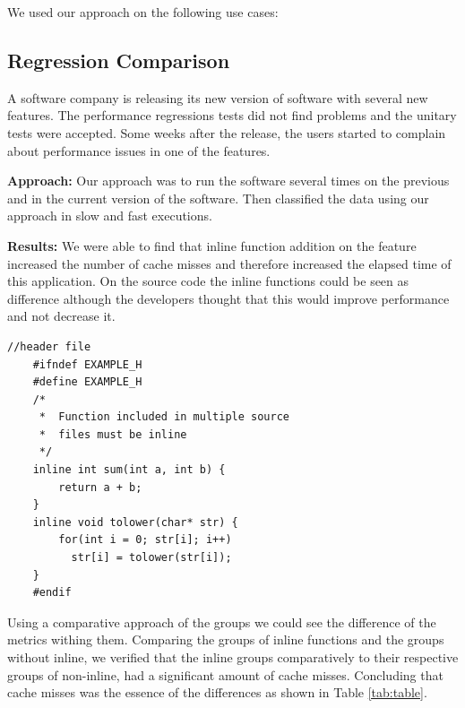 We used our approach on the following use cases:

\subsection{\textbf{Regression Comparison}}
    A software company is releasing its new version of software with several new features. The performance regressions tests did not find problems and the unitary tests were accepted. Some weeks after the release, the users started to complain about performance issues in one of the features.
    
\textbf{Approach:} 
    Our approach was to run the software several times on the previous and in the current version of the software. Then classified the data using our approach in slow and fast executions. 
        
\textbf{Results:}
    We were able to find that inline function addition on the feature increased the number of cache misses and therefore increased the elapsed time of this application. On the source code the inline functions could be seen as difference although the developers thought that this would improve performance and not decrease it.
    
    \begin{lstlisting}[caption={Example of Code for inline}, label=pseudo:case-inline, captionpos=b]
    //header file
    #ifndef EXAMPLE_H
    #define EXAMPLE_H
    /*  
     *  Function included in multiple source
     *  files must be inline 
     */
    inline int sum(int a, int b) {
        return a + b;
    }
    inline void tolower(char* str) {
        for(int i = 0; str[i]; i++)
          str[i] = tolower(str[i]);
    }
    #endif
    \end{lstlisting}
    
    
    Using a comparative approach of the groups we could see the difference of the metrics withing them. Comparing the groups of inline functions and the groups without inline, we verified that the inline groups comparatively to their respective groups of non-inline, had a significant amount of cache misses. Concluding that cache misses was the essence of the differences as shown in Table \ref{tab:table}.
    
